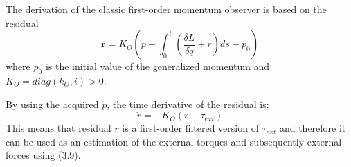     The derivation of the classic first-order momentum observer is based on the residual
\begin{equation}
    \textbf{r} = K_O( p - \int_0^t{(\frac{\delta L}{\delta q} + r)}ds - p_0 )
\end{equation}
    where $p_0$ is the initial value of the generalized momentum and $K_O = diag(k_O, i)>0$.

    By using the acquired $\dot p$, the time derivative of the residual is:
\begin{equation}
    \dot r = -K_O(r - \tau_{ext})
\end{equation}
This means that residual $r$ is a first-order filtered version of $\tau_{ext}$ and therefore it can be used as an estimation of the external torques and subsequently external forces using (3.9).